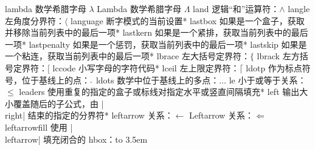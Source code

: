 \capcs lambda {数学希腊字母 $\lambda$}{}{}
\capcs Lambda {数学希腊字母 $\Lambda$}{}{}
\capcs land {逻辑“和”运算符：$\land$}{}{}
\capcs langle {左角度分界符：$\langle$}{}{}
\capcs language {断字模式的当前设置}*{}
\capcs lastbox {如果是一个盒子，获取并移除当前列表中的最后一项}*{}
\capcs lastkern {如果是一个紧排，获取当前列表中的最后一项}*{}
\capcs lastpenalty {如果是一个惩罚，获取当前列表中的最后一项}*{}
\capcs lastskip {如果是一个粘连，获取当前列表中的最后一项}*{}
\capcs lbrace {左大括号定界符：$\lbrace$}{}{}
\capcs lbrack {左方括号定界符：$\lbrack$}{}{}
\capcs lccode {小写字母的字符代码}*{}
\capcs lceil {左上限定界符：$\lceil$}{}{}
\capcs ldotp {作为标点符号，位于基线上的点：$\ldotp$}{}{}
\capcs ldots {数学中位于基线上的多点：$\ldots$}{}{}
\capcs le {小于或等于关系：$\le$}{}{}
\capcs leaders {使用重复的指定的盒子或标线对指定水平或竖直间隔填充}*{}
\capcs left {输出大小覆盖随后的子公式，由 |\\right| 结束的指定的分界符}*{}
\capcs leftarrow {关系：$\leftarrow$}{}{}
\capcs Leftarrow {关系：$\Leftarrow$}{}{}
\capcs leftarrowfill {使用 |\\leftarrow| 填充闭合的 hbox：\hbox to 3.5em{\leftarrowfill}}{}{}
